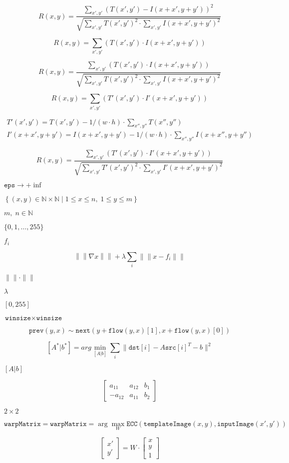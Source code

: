 \documentclass{article}
\begin{document}
\[R(x,y)= \frac{\sum_{x',y'} (T(x',y')-I(x+x',y+y'))^2}{\sqrt{\sum_{x',y'}T(x',y')^2 \cdot \sum_{x',y'} I(x+x',y+y')^2}}\]
\pagebreak

\[R(x,y)= \sum _{x',y'} (T(x',y') \cdot I(x+x',y+y'))\]
\pagebreak

\[R(x,y)= \frac{\sum_{x',y'} (T(x',y') \cdot I(x+x',y+y'))}{\sqrt{\sum_{x',y'}T(x',y')^2 \cdot \sum_{x',y'} I(x+x',y+y')^2}}\]
\pagebreak

\[R(x,y)= \sum _{x',y'} (T'(x',y') \cdot I'(x+x',y+y'))\]
\pagebreak

\[\begin{array}{l} T'(x',y')=T(x',y') - 1/(w \cdot h) \cdot \sum _{x'',y''} T(x'',y'') \\ I'(x+x',y+y')=I(x+x',y+y') - 1/(w \cdot h) \cdot \sum _{x'',y''} I(x+x'',y+y'') \end{array}\]
\pagebreak

\[R(x,y)= \frac{ \sum_{x',y'} (T'(x',y') \cdot I'(x+x',y+y')) }{ \sqrt{\sum_{x',y'}T'(x',y')^2 \cdot \sum_{x',y'} I'(x+x',y+y')^2} }\]
\pagebreak

$\texttt{eps}\rightarrow +\inf$
\pagebreak

$\left\{(x,y)\in\mathbb{N}\times\mathbb{N}\mid 1\leq x\leq n,\;1\leq y\leq m\right\}$
\pagebreak

$m,\;n\in\mathbb{N}$
\pagebreak

$\{0,1,\dots,255\}$
\pagebreak

$f_i$
\pagebreak

\[\left\|\left\|\nabla x\right\|\right\| + \lambda\sum_i\left\|\left\|x-f_i\right\|\right\|\]
\pagebreak

$\|\|\cdot\|\|$
\pagebreak

$\lambda$
\pagebreak

$[0,255]$
\pagebreak

$\texttt{winsize}\times\texttt{winsize}$
\pagebreak

\[\texttt{prev} (y,x) \sim \texttt{next} ( y + \texttt{flow} (y,x)[1], x + \texttt{flow} (y,x)[0])\]
\pagebreak

\[[A^*|b^*] = arg \min _{[A|b]} \sum _i \| \texttt{dst}[i] - A { \texttt{src}[i]}^T - b \| ^2\]
\pagebreak

$[A|b]$
\pagebreak

\[\begin{bmatrix} a_{11} & a_{12} & b_1 \\ -a_{12} & a_{11} & b_2 \end{bmatrix}\]
\pagebreak

$2\times 2$
\pagebreak

\[\texttt{warpMatrix} = \texttt{warpMatrix} = \arg\max_{W} \texttt{ECC}(\texttt{templateImage}(x,y),\texttt{inputImage}(x',y'))\]
\pagebreak

\[\begin{bmatrix} x' \\ y' \end{bmatrix} = W \cdot \begin{bmatrix} x \\ y \\ 1 \end{bmatrix}\]
\pagebreak
\end{document}
